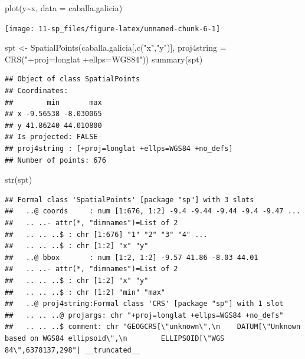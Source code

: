 \documentclass[
  spanish,
]{book}
\newenvironment{Shaded}{\begin{snugshade}}{\end{snugshade}}
\newcommand{\AttributeTok}[1]{\textcolor[rgb]{0.77,0.63,0.00}{#1}}
\newcommand{\FunctionTok}[1]{\textcolor[rgb]{0.00,0.00,0.00}{#1}}
\newcommand{\NormalTok}[1]{#1}
\newcommand{\OtherTok}[1]{\textcolor[rgb]{0.56,0.35,0.01}{#1}}
\newcommand{\SpecialCharTok}[1]{\textcolor[rgb]{0.00,0.00,0.00}{#1}}
\newcommand{\StringTok}[1]{\textcolor[rgb]{0.31,0.60,0.02}{#1}}
\theoremstyle{break}
\begin{document}
\begin{Shaded}
\begin{Highlighting}[]
\FunctionTok{plot}\NormalTok{(y}\SpecialCharTok{\textasciitilde{}}\NormalTok{x, }\AttributeTok{data =}\NormalTok{ caballa.galicia)}
\end{Highlighting}
\end{Shaded}

\begin{center}\texttt{[image: 11-sp\_files/figure-latex/unnamed-chunk-6-1]} \end{center}

\begin{Shaded}
\begin{Highlighting}[]
\NormalTok{spt }\OtherTok{\textless{}{-}} \FunctionTok{SpatialPoints}\NormalTok{(caballa.galicia[,}\FunctionTok{c}\NormalTok{(}\StringTok{"x"}\NormalTok{,}\StringTok{"y"}\NormalTok{)], }\AttributeTok{proj4string =} \FunctionTok{CRS}\NormalTok{(}\StringTok{"+proj=longlat +ellps=WGS84"}\NormalTok{))}
\FunctionTok{summary}\NormalTok{(spt)}
\end{Highlighting}
\end{Shaded}

\begin{verbatim}
## Object of class SpatialPoints
## Coordinates:
##        min       max
## x -9.56538 -8.030065
## y 41.86240 44.010800
## Is projected: FALSE 
## proj4string : [+proj=longlat +ellps=WGS84 +no_defs]
## Number of points: 676
\end{verbatim}

\begin{Shaded}
\begin{Highlighting}[]
\FunctionTok{str}\NormalTok{(spt)}
\end{Highlighting}
\end{Shaded}

\begin{verbatim}
## Formal class 'SpatialPoints' [package "sp"] with 3 slots
##   ..@ coords     : num [1:676, 1:2] -9.4 -9.44 -9.44 -9.4 -9.47 ...
##   .. ..- attr(*, "dimnames")=List of 2
##   .. .. ..$ : chr [1:676] "1" "2" "3" "4" ...
##   .. .. ..$ : chr [1:2] "x" "y"
##   ..@ bbox       : num [1:2, 1:2] -9.57 41.86 -8.03 44.01
##   .. ..- attr(*, "dimnames")=List of 2
##   .. .. ..$ : chr [1:2] "x" "y"
##   .. .. ..$ : chr [1:2] "min" "max"
##   ..@ proj4string:Formal class 'CRS' [package "sp"] with 1 slot
##   .. .. ..@ projargs: chr "+proj=longlat +ellps=WGS84 +no_defs"
##   .. .. ..$ comment: chr "GEOGCRS[\"unknown\",\n    DATUM[\"Unknown based on WGS84 ellipsoid\",\n        ELLIPSOID[\"WGS 84\",6378137,298"| __truncated__
\end{verbatim}
\end{document}
